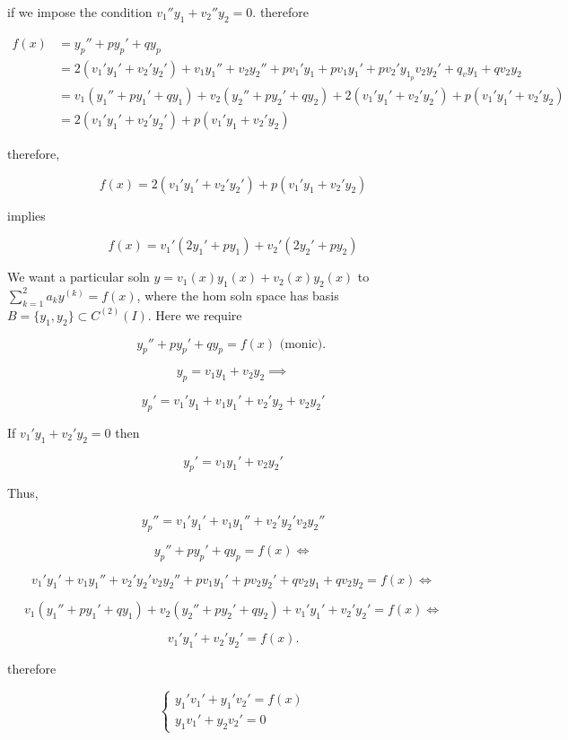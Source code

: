 \documentclass[12pt,a4paper]{article}
\theoremstyle{definition}
\begin{document}
if we impose the condition \( v_1''y_1 + v_2''y_2 = 0. \) therefore 

\begin{align*}
  f(x) &= y_p'' + py_p' + qy_p \\
  &= 2(v_1'y_1' + v_2'y_2') + v_1y_1'' + v_2y_2'' +
  pv_1'y_1 + pv_1y_1' + pv_2'y_1 _ pv_2y_2' + q_vy_1 + qv_2y_2\\
  &= v_1(y_1'' + py_1' +qy_1) + v_2(y_2'' + py_2' +qy_2) + 2(v_1'y_1' +
  v_2'y_2') + p(v_1'y_1'+v_2'y_2) \\
  &= 2(v_1'y_1' + v_2'y_2') + p(v_1'y_1 + v_2'y_2)
\end{align*}

therefore, 

\[ f(x) =  2(v_1'y_1' + v_2'y_2') + p(v_1'y_1 + v_2'y_2)
\]

implies 

\[ f(x) = v_1'(2y_1' +py_1) + v_2'(2y_2' +py_2) \]


\newpage
{}

We want a particular soln \( y = v_1(x) y_1(x) + v_2(x) y_2(x) \) to \(
\sum_{k=1}^{2} a_k y^{(k)} = f(x) \), where the hom soln space has basis
\( B = \{ y_1, y_2 \}  \subset C^{(2)}(I) \). Here we require 

\[  y_p'' + py_p' + qy_p = f(x) \text{ (monic). } \]

\[ y_p = v_1y_1 + v_2y_2 \implies \]

\[ y_p' = v_1'y_1 + v_1y_1' + v_2'y_2 + v_2y_2' \]

If \( v_1'y_1 + v_2'y_2 = 0 \) then 

\[ y_p' = v_1y_1' + v_2y_2' \]

Thus, 

\[ y_p'' = v_1'y_1' + v_1y_1'' + v_2'y_2' v_2y_2'' \]

\[ y_p'' +py_p' + qy_p = f(x) \iff \]

\[ v_1'y_1' + v_1y_1'' + v_2'y_2' v_2y_2'' + pv_1y_1' + pv_2y_2' +
qv_2y_1 + qv_2y_2 = f(x) \iff \]

\[ v_1(y_1'' + py_1' + qy_1) + v_2(y_2'' + py_2' + qy_2) + v_1' y_1' +
v_2'y_2' = f(x) \iff \]

\[ v_1'y_1' + v_2'y_2' = f(x). \]

therefore

\[
\begin{cases}
  y_1' v_1' + y_1'v_2' = f(x) \\
  y_1v_1' + y_2v_2' = 0
\end{cases}
\]
\end{document}

